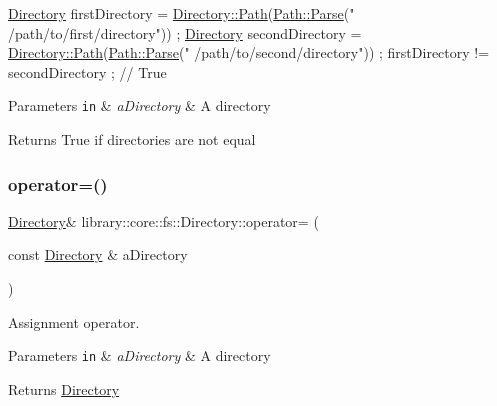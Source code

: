 \begin{DoxyCode}
\hyperlink{classlibrary_1_1core_1_1fs_1_1Directory_a3ec39f6cad19a81d520e9a1f2d8bb1f7}{Directory} firstDirectory = \hyperlink{classlibrary_1_1core_1_1fs_1_1Directory_a6d3ea04654841e62a4dbd99feb563caf}{Directory::Path}(\hyperlink{classlibrary_1_1core_1_1fs_1_1Path_aebf5bd3af83e0b7376616e146f3e55df}{Path::Parse}(\textcolor{stringliteral}{"
      /path/to/first/directory"})) ;
\hyperlink{classlibrary_1_1core_1_1fs_1_1Directory_a3ec39f6cad19a81d520e9a1f2d8bb1f7}{Directory} secondDirectory = \hyperlink{classlibrary_1_1core_1_1fs_1_1Directory_a6d3ea04654841e62a4dbd99feb563caf}{Directory::Path}(\hyperlink{classlibrary_1_1core_1_1fs_1_1Path_aebf5bd3af83e0b7376616e146f3e55df}{Path::Parse}(\textcolor{stringliteral}{"
      /path/to/second/directory"})) ;
firstDirectory != secondDirectory ; \textcolor{comment}{// True}
\end{DoxyCode}



\begin{DoxyParams}[1]{Parameters}
\mbox{\tt in}  & {\em a\+Directory} & A directory \\
\hline
\end{DoxyParams}
\begin{DoxyReturn}{Returns}
True if directories are not equal 
\end{DoxyReturn}
\mbox{\label{classlibrary_1_1core_1_1fs_1_1Directory_ae49af93d5b45fd410634ab14d82a690a}} 
\subsubsection{\texorpdfstring{operator=()}{operator=()}}
{\footnotesize\ttfamily \hyperlink{classlibrary_1_1core_1_1fs_1_1Directory}{Directory}\& library\+::core\+::fs\+::\+Directory\+::operator= (\begin{DoxyParamCaption}\item[{const \hyperlink{classlibrary_1_1core_1_1fs_1_1Directory}{Directory} \&}]{a\+Directory }\end{DoxyParamCaption})}



Assignment operator. 


\begin{DoxyParams}[1]{Parameters}
\mbox{\tt in}  & {\em a\+Directory} & A directory \\
\hline
\end{DoxyParams}
\begin{DoxyReturn}{Returns}
\hyperlink{classlibrary_1_1core_1_1fs_1_1Directory}{Directory} 
\end{DoxyReturn}
\mbox{\label{classlibrary_1_1core_1_1fs_1_1Directory_a7d1a76c04ba3750606c3f22519d0ef66}} 
